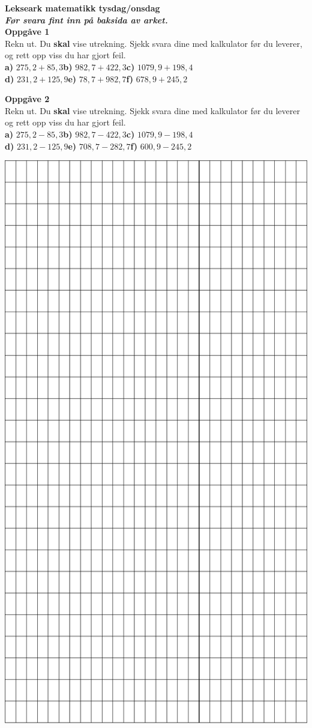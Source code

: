 \documentclass[english,hidelinks,pdftex, 11 pt, class=report,crop=false]{standalone}
\begin{document}
\huge \textbf{Lekseark matematikk tysdag/onsdag} \\[25pt]
\large
\textit{\textbf{Før svara fint inn på baksida av arket.}} \\[15pt]
{\Large \textbf{Oppgåve 1}}\\[10pt]
Rekn ut. Du \textbf{skal} vise utrekning. Sjekk svara dine med kalkulator før du leverer, og rett opp viss du har gjort feil. \\[10pt]
\textbf{a)} $ 275,2+85,3 $\qquad \textbf{b)} $ 982,7+422,3 $\qquad \textbf{c)} $ 1079,9+198,4 $\\[12pt]
\textbf{d)} $ 231,2+125,9 $\qquad \textbf{e)} $ 78,7+982,7 $\qquad \textbf{f)} $ 678,9+245,2 $ \vspace{30pt}

{\Large \textbf{Oppgåve 2}}\\[10pt]
Rekn ut. Du \textbf{skal} vise utrekning. Sjekk svara dine med kalkulator før du leverer og rett opp viss du har gjort feil. \\[10pt]
\textbf{a)} $ 275,2-85,3 $\qquad \textbf{b)} $ 982,7-422,3 $\qquad \textbf{c)} $ 1079,9-198,4 $\\[12pt]
\textbf{d)} $ 231,2-125,9 $\qquad \textbf{e)} $ 708,7-282,7 $\qquad \textbf{f)} $ 600,9-245,2 $
\begin{center}
	\includegraphics[]{sheet}
\end{center}
\end{document}
